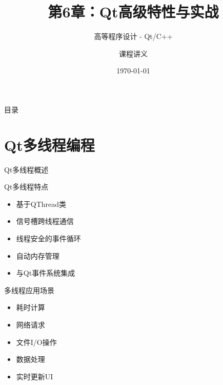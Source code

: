 \documentclass[UTF8,aspectratio=169]{beamer}
\title{第6章：Qt高级特性与实战}
\subtitle{高等程序设计 - Qt/C++}
\author{课程讲义}
\institute{高等程序设计课程}
\date{\today}
\begin{document}
\begin{frame}
    \titlepage
\end{frame}

\begin{frame}{目录}
    \tableofcontents
\end{frame}

\section{Qt多线程编程}

\begin{frame}{Qt多线程概述}
    \begin{block}{Qt多线程特点}
        \begin{itemize}
            \item 基于QThread类
            \item 信号槽跨线程通信
            \item 线程安全的事件循环
            \item 自动内存管理
            \item 与Qt事件系统集成
        \end{itemize}
    \end{block}

    \begin{block}{多线程应用场景}
        \begin{itemize}
            \item 耗时计算
            \item 网络请求
            \item 文件I/O操作
            \item 数据处理
            \item 实时更新UI
        \end{itemize}
    \end{block}
\end{frame}
\end{document}
